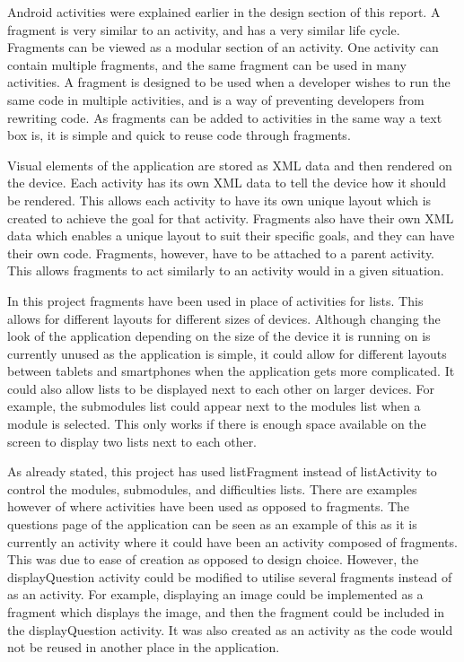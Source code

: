 \documentclass{article}
\begin{document}
Android activities were explained earlier in the design section of this report. A fragment is very similar to an activity, and has a very similar life cycle. Fragments can be viewed as a modular section of an activity. One activity can contain multiple fragments, and the same fragment can be used in many activities. A fragment is designed to be used when a developer wishes to run the same code in multiple activities, and is a way of preventing developers from rewriting code. As fragments can be added to activities in the same way a text box is, it is simple and quick to reuse code through fragments. \par

Visual elements of the application are stored as XML data and then rendered on the device. Each activity has its own XML data to tell the device how it should be rendered. This allows each activity to have its own unique layout which is created to achieve the goal for that activity. Fragments also have their own XML data which enables a unique layout to suit their specific goals, and they can have their own code. Fragments, however, have to be attached to a parent activity. This allows fragments to act similarly to an activity would in a given situation. \par

In this project fragments have been used in place of activities for lists. This allows for different layouts for different sizes of devices. Although changing the look of the application depending on the size of the device it is running on is currently unused as the application is simple, it could allow for different layouts between tablets and smartphones when the application gets more complicated. It could also allow lists to be displayed next to each other on larger devices. For example, the submodules list could appear next to the modules list when a module is selected. This only works if there is enough space available on the screen to display two lists next to each other. \par

As already stated, this project has used listFragment instead of listActivity to control the modules, submodules, and difficulties lists. There are examples however of where activities have been used as opposed to fragments. The questions page of the application can be seen as an example of this as it is currently an activity where it could have been an activity composed of fragments. This was due to ease of creation as opposed to design choice. However, the displayQuestion activity could be modified to utilise several fragments instead of as an activity. For example, displaying an image could be implemented as a fragment which displays the image, and then the fragment could be included in the displayQuestion activity. It was also created as an activity as the code would not be reused in another place in the application. \par
\end{document}
